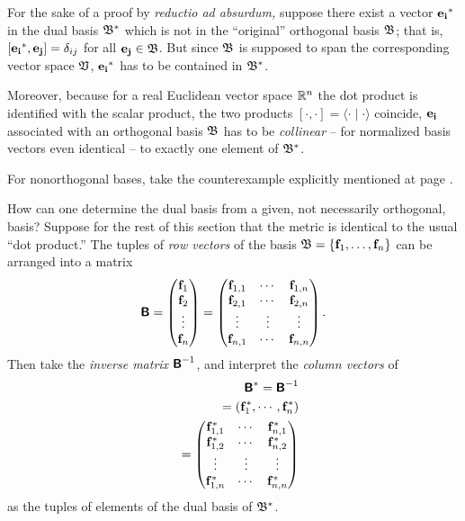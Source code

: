 {\color{OliveGreen}
\bproof

For the sake of a proof by {\it reductio ad absurdum,}
suppose there exist a vector ${\bf e_i}^*$ in the dual basis  ${\frak B}^*$
which is not in  the ``original'' orthogonal basis ${\frak B}$;
that is, $[{\bf e_i}^*,{\bf e_j}]=\delta_{ij}$ for all ${\bf e_j} \in {\frak B}$.
But since ${\frak B}$ is supposed to span the corresponding vector space ${\frak V}$,
${\bf e_i}^*$ has to be contained in ${\frak B}^*$.

Moreover,
because for  a real Euclidean vector space ${\Bbb R}^n$
the dot product is identified with the scalar product,
the two products
$[\cdot , \cdot ]=\langle \cdot \mid \cdot \rangle$
coincide, ${\bf e_i}$  associated with an orthogonal basis ${\frak B}$
has to be {\em collinear}
-- for normalized basis vectors even identical -- to exactly one element of ${\frak B}^*$.

For nonorthogonal bases, take the counterexample explicitly mentioned at page \pageref{2011-m-cenobdb}.
\eproof
}

How can one determine the dual basis from a given,
not necessarily orthogonal, basis?
Suppose for the rest of this section that the metric is identical to the usual ``dot product.''
The tuples of {\em row vectors} of the basis ${\frak B} = \{{\bf f}_1,\ldots , {\bf f}_n\}$
can be arranged into a matrix
\begin{equation}
\textsf{\textbf{B}}
=
\begin{pmatrix}
{\bf f}_{1}\\
{\bf f}_{2}\\
\vdots  \\
{\bf f}_{n}
\end{pmatrix}
=
\begin{pmatrix}
{\bf f}_{1,1}&\cdots & {\bf f}_{1,n}\\
{\bf f}_{2,1}&\cdots & {\bf f}_{2,n}\\
\vdots&\vdots & \vdots \\
{\bf f}_{n,1}&\cdots & {\bf f}_{n,n}
\end{pmatrix}
.
\end{equation}
Then take the
{\em inverse matrix}
$\textsf{\textbf{B}}^{-1}$,
and interpret the
{\em column vectors} of
\begin{equation}
\begin{split}
\textsf{\textbf{B}}^{\ast}=\textsf{\textbf{B}}^{-1}
\\
\quad
=\left({\bf f}_{1}^\ast ,\cdots , {\bf f}_{n}^\ast\right)
\\
\quad
=
\begin{pmatrix}
{\bf f}_{1,1}^\ast&\cdots & {\bf f}_{n,1}^\ast\\
{\bf f}_{1,2}^\ast&\cdots & {\bf f}_{n,2}^\ast\\
\vdots&\vdots & \vdots \\
{\bf f}_{1,n}^\ast&\cdots & {\bf f}_{n,n}^\ast
\end{pmatrix}
\end{split}
\end{equation}
as the tuples of elements of the dual basis of ${\frak B}^*$.

